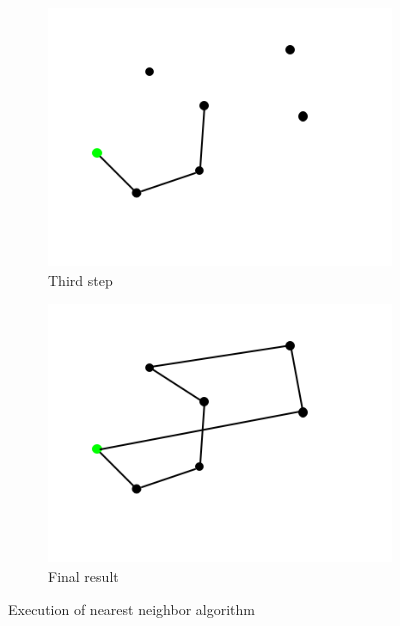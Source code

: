 \begin{figure}[h!]
\begin{subfigure}[b]{0.4\linewidth}
    \includegraphics[width=\linewidth]{media/neighbor3.png}
    \caption{Third step}
  \end{subfigure}
  \begin{subfigure}[b]{0.4\linewidth}
    \includegraphics[width=\linewidth]{media/neighbor4.png}
    \caption{Final result}
  \end{subfigure}
  \caption{Execution of nearest neighbor algorithm}
\end{figure}

